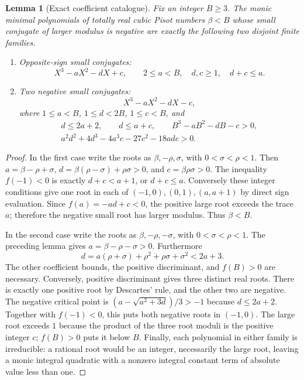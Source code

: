 \documentclass[11pt,a4paper]{article}
\newtheorem{lemma}[theorem]{Lemma}
\theoremstyle{definition}
\theoremstyle{remark}
\numberwithin{equation}{section}
\begin{document}
\begin{lemma}[Exact coefficient catalogue]\label{tw:lem:cubic-catalogue}
Fix an integer $B\ge3$. The monic minimal polynomials of totally real
cubic Pisot numbers $\beta<B$ whose small conjugate of larger modulus
is negative are exactly the following two disjoint finite families.
\begin{enumerate}
\item Opposite-sign small conjugates:
\[
 X^3-aX^2-dX+c,\qquad
 2\le a<B,\quad d,c\ge1,\quad d+c\le a.
\]
\item Two negative small conjugates:
\[
 X^3-aX^2-dX-c,
\]
where $1\le a<B$, $1\le d<2B$, $1\le c<B$, and
\[
 \begin{gathered}
 d\le2a+2,\qquad d\le a+c,\qquad B^3-aB^2-dB-c>0,\\
 a^2d^2+4d^3-4a^3c-27c^2-18adc>0.
 \end{gathered}
\]
\end{enumerate}
\end{lemma}
\begin{proof}
In the first case write the roots as $\beta,-\rho,\sigma$, with
$0<\sigma<\rho<1$. Then $a=\beta-\rho+\sigma$,
$d=\beta(\rho-\sigma)+\rho\sigma>0$, and $c=\beta\rho\sigma>0$.
The inequality $f(-1)<0$ is exactly $d+c<a+1$, or $d+c\le a$.
Conversely these integer conditions give one root in each of
$(-1,0),(0,1),(a,a+1)$ by direct sign evaluation. Since
$f(a)=-ad+c<0$, the positive large root exceeds the trace $a$;
therefore the negative small root has larger modulus. Thus $\beta<B$.

In the second case write the roots as $\beta,-\rho,-\sigma$, with
$0<\sigma<\rho<1$. The preceding lemma gives
$a=\beta-\rho-\sigma>0$. Furthermore
\[
 d=a(\rho+\sigma)+\rho^2+\rho\sigma+\sigma^2<2a+3.
\]
The other coefficient bounds, the positive discriminant, and $f(B)>0$
are necessary. Conversely, positive discriminant gives three distinct
real roots. There is exactly one positive root by Descartes' rule,
and the other two are negative. The negative critical point is
$(a-\sqrt{a^2+3d})/3>-1$ because $d\le2a+2$.
Together with $f(-1)<0$, this puts both negative roots in $(-1,0)$.
The large root exceeds $1$ because the product of the three root
moduli is the positive integer $c$; $f(B)>0$ puts it below $B$.
Finally, each polynomial in either family is irreducible: a rational
root would be an integer, necessarily the large root, leaving a
monic integral quadratic with a nonzero integral constant term of
absolute value less than one.
\end{proof}
\end{document}

